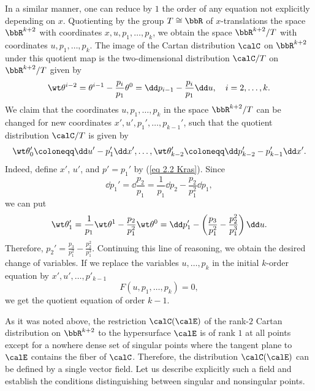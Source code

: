 In a similar manner, one can reduce by $1$ the order of any equation not explicitly depending on $x$. Quotienting by the group $T\cong\bbR$ of $x$-translations the space $\bbR^{k+2}$ with coordinates $x,u,p_1,\ldots,p_k$, we obtain the space $\bbR^{k+2}\slash T$ with coordinates $u,p_1,\ldots,p_k$. The image of the Cartan distribution $\calC$ on $\bbR^{k+2}$ under this quotient map is the two-dimensional distribution $\calC\slash T$ on $\bbR^{k+2}\slash T$ given by 
\[
    \wt\theta^{i-2}=\theta^{i-1}-\frac{p_i}{p_1}\theta^0=\dd p_{i-1}-\frac{p_i}{p_1}\dd u,\quad i=2,\ldots,k.
\]
We claim that the coordinates $u,p_1,\ldots,p_k$ in the space $\bbR^{k+2}\slash T$ can be changed for new coordinates $x',u',p_1',\ldots,p_{k-1}'$, such that the quotient distribution $\calC\slash T$ is given by 
\[\wt\theta_0'\coloneqq \dd u'-p_1'\dd x',\ldots,\wt\theta_{k-2}'\coloneqq \dd p_{k-2}'-p_{k-1}'\dd x'.\]
Indeed, define $x'$, $u'$, and $p'=p_1'$ by (\ref{eq 2.2 Kras}). Since 
\[\dd p_1'=\dd \frac{p_2}{p_1}=\frac{1}{p_1}\dd p_2-\frac{p_2}{p_1^2}\dd p_1,\]
we can put 
\[\wt\theta_1'=\frac{1}{p_1}\wt\theta^1-\frac{p_2}{p_1^2}\wt\theta^0=\dd p_1'-\left(\frac{p_3}{p_1^2}-\frac{p_2^2}{p_1^3}\right)\dd u.\]
Therefore, $p_2'=\frac{p_3}{p_1^2}-\frac{p_2^2}{p_1^3}$. Continuing this line of reasoning, we obtain the desired change of variables. If we replace the variables $u,\ldots,p_k$ in the initial $k$-order equation by $x',u',\ldots,p'_{k-1}$
\[F(u,p_1,\ldots,p_k)=0,\]
we get the quotient equation of order $k-1$.

As it was noted above, the restriction $\calC(\calE)$ of the rank-$2$ Cartan distribution on $\bbR^{k+2}$ to the hypersurface $\calE$ is of rank $1$ at all points except for a nowhere dense set of singular points where the tangent plane to $\calE$ contains the fiber of $\calC$. Therefore, the distribution $\calC(\calE)$ can be defined by a single vector field. Let us describe explicitly such a field and establish the conditions distinguishing between singular and nonsingular points.

